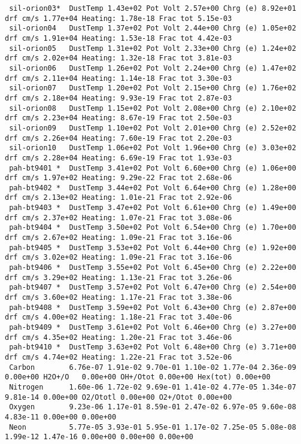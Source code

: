 {\begin{verbatim}
 sil-orion03*  DustTemp 1.43e+02 Pot Volt 2.57e+00 Chrg (e) 8.92e+01 drf cm/s 1.77e+04 Heating: 1.78e-18 Frac tot 5.15e-03
 sil-orion04   DustTemp 1.37e+02 Pot Volt 2.44e+00 Chrg (e) 1.05e+02 drf cm/s 1.91e+04 Heating: 1.53e-18 Frac tot 4.42e-03
 sil-orion05   DustTemp 1.31e+02 Pot Volt 2.33e+00 Chrg (e) 1.24e+02 drf cm/s 2.02e+04 Heating: 1.32e-18 Frac tot 3.81e-03
 sil-orion06   DustTemp 1.26e+02 Pot Volt 2.24e+00 Chrg (e) 1.47e+02 drf cm/s 2.11e+04 Heating: 1.14e-18 Frac tot 3.30e-03
 sil-orion07   DustTemp 1.20e+02 Pot Volt 2.15e+00 Chrg (e) 1.76e+02 drf cm/s 2.18e+04 Heating: 9.93e-19 Frac tot 2.87e-03
 sil-orion08   DustTemp 1.15e+02 Pot Volt 2.08e+00 Chrg (e) 2.10e+02 drf cm/s 2.23e+04 Heating: 8.67e-19 Frac tot 2.50e-03
 sil-orion09   DustTemp 1.10e+02 Pot Volt 2.01e+00 Chrg (e) 2.52e+02 drf cm/s 2.26e+04 Heating: 7.60e-19 Frac tot 2.20e-03
 sil-orion10   DustTemp 1.06e+02 Pot Volt 1.96e+00 Chrg (e) 3.03e+02 drf cm/s 2.28e+04 Heating: 6.69e-19 Frac tot 1.93e-03
 pah-bt9401 *  DustTemp 3.41e+02 Pot Volt 6.60e+00 Chrg (e) 1.06e+00 drf cm/s 1.97e+02 Heating: 9.29e-22 Frac tot 2.68e-06
 pah-bt9402 *  DustTemp 3.44e+02 Pot Volt 6.64e+00 Chrg (e) 1.28e+00 drf cm/s 2.13e+02 Heating: 1.01e-21 Frac tot 2.92e-06
 pah-bt9403 *  DustTemp 3.47e+02 Pot Volt 6.61e+00 Chrg (e) 1.49e+00 drf cm/s 2.37e+02 Heating: 1.07e-21 Frac tot 3.08e-06
 pah-bt9404 *  DustTemp 3.50e+02 Pot Volt 6.54e+00 Chrg (e) 1.70e+00 drf cm/s 2.67e+02 Heating: 1.09e-21 Frac tot 3.16e-06
 pah-bt9405 *  DustTemp 3.53e+02 Pot Volt 6.44e+00 Chrg (e) 1.92e+00 drf cm/s 3.02e+02 Heating: 1.09e-21 Frac tot 3.16e-06
 pah-bt9406 *  DustTemp 3.55e+02 Pot Volt 6.45e+00 Chrg (e) 2.22e+00 drf cm/s 3.29e+02 Heating: 1.13e-21 Frac tot 3.26e-06
 pah-bt9407 *  DustTemp 3.57e+02 Pot Volt 6.47e+00 Chrg (e) 2.54e+00 drf cm/s 3.60e+02 Heating: 1.17e-21 Frac tot 3.38e-06
 pah-bt9408 *  DustTemp 3.59e+02 Pot Volt 6.43e+00 Chrg (e) 2.87e+00 drf cm/s 4.00e+02 Heating: 1.18e-21 Frac tot 3.40e-06
 pah-bt9409 *  DustTemp 3.61e+02 Pot Volt 6.46e+00 Chrg (e) 3.27e+00 drf cm/s 4.35e+02 Heating: 1.20e-21 Frac tot 3.46e-06
 pah-bt9410 *  DustTemp 3.63e+02 Pot Volt 6.48e+00 Chrg (e) 3.71e+00 drf cm/s 4.74e+02 Heating: 1.22e-21 Frac tot 3.52e-06
 Carbon        6.76e-07 1.91e-02 9.70e-01 1.10e-02 1.77e-04 2.36e-09 0.00e+00 H2O+/O   0.00e+00 OH+/Otot 0.00e+00 Hex(tot) 0.00e+00
 Nitrogen      1.60e-06 1.72e-02 9.69e-01 1.41e-02 4.77e-05 1.34e-07 9.81e-14 0.00e+00 O2/Ototl 0.00e+00 O2+/Otot 0.00e+00
 Oxygen        9.23e-06 1.17e-01 8.59e-01 2.47e-02 6.97e-05 9.60e-08 4.83e-11 0.00e+00 0.00e+00
 Neon          5.77e-05 3.93e-01 5.95e-01 1.17e-02 7.25e-05 5.08e-08 1.99e-12 1.47e-16 0.00e+00 0.00e+00 0.00e+00

\end{verbatim}}
